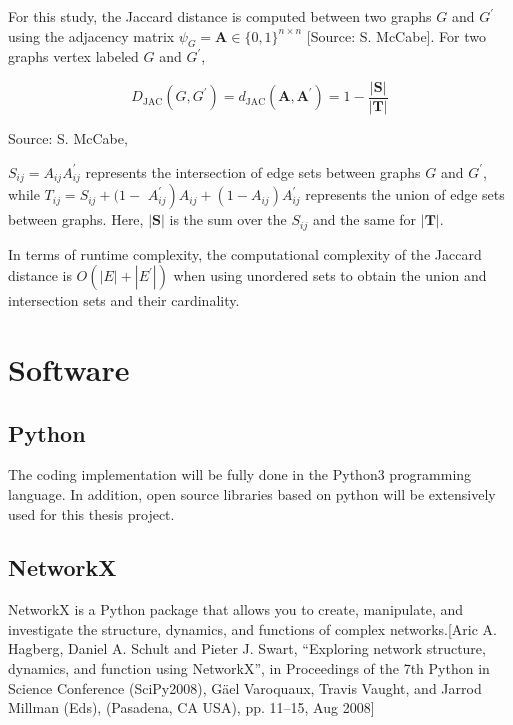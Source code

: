 For this study, the Jaccard distance is computed between two graphs $G$ and $G^{\prime}$ using the adjacency matrix $\psi_{G}=\mathbf{A} \in\{0,1\}^{n \times n}$ [Source: S. McCabe]. For two graphs vertex labeled $G$ and $G^{\prime}$,

\begin{equation}
D_{\mathrm{JAC}}\left(G, G^{\prime}\right)=d_{\mathrm{JAC}}\left(\mathbf{A}, \mathbf{A}^{\prime}\right)=1-\frac{|\mathbf{S}|}{|\mathbf{T}|}
\end{equation}
\caption{Source: S. McCabe,}

$S_{i j}=A_{i j} A_{i j}^{\prime}$ represents the intersection of edge sets between graphs $G$ and $G^{\prime}$, while $T_{i j}=S_{i j}+(1-$ $\left.A_{i j}^{\prime}\right) A_{i j}+\left(1-A_{i j}\right) A_{i j}^{\prime}$ represents the union of edge sets between graphs. Here, $|\mathbf{S}|$ is the sum over the $S_{i j}$ and the same for $|\mathbf{T}|$. 

In terms of runtime complexity, the computational complexity of the Jaccard distance is $O\left(|E|+\left|E^{\prime}\right|\right)$ when using unordered sets to obtain the union and intersection sets and their cardinality.

\section{Software}
\subsection{Python}
The coding implementation will be fully done in the Python3 programming language. In addition, open source libraries based on python will be extensively used for this thesis project.

\subsection{NetworkX}
NetworkX is a Python package that allows you to create, manipulate, and investigate the structure, dynamics, and functions of complex networks.[Aric A. Hagberg, Daniel A. Schult and Pieter J. Swart, “Exploring network structure, dynamics, and function using NetworkX”, in Proceedings of the 7th Python in Science Conference (SciPy2008), Gäel Varoquaux, Travis Vaught, and Jarrod Millman (Eds), (Pasadena, CA USA), pp. 11–15, Aug 2008]

